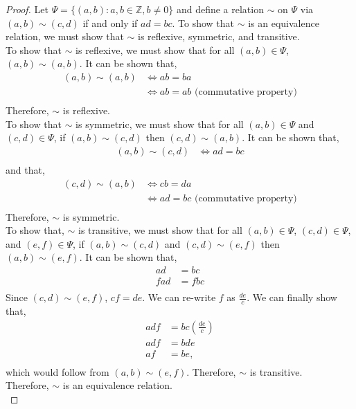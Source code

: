 \documentclass[12pt]{article}
\begin{document}
	\begin{proof}
	Let $\Psi = \{(a,b): a,b \in \mathbb{Z}, b\neq 0\}$ and define a relation $\sim$ on $\Psi$ via $(a,b) \sim (c,d)$ if and only if
	$ad=bc$. To show that $\sim$ is an equivalence relation, we must show that $\sim$ is reflexive, symmetric, and transitive.\\

	To show that $\sim$ is reflexive, we must show that for all $(a,b) \in \Psi$, $(a,b) \sim (a,b)$.
	It can be shown that, 
	\begin{align*}
		(a,b) \sim (a,b) &\Leftrightarrow ab=ba\\
				 &\Leftrightarrow ab=ab \text{ (commutative property)}\\
	\end{align*}
	Therefore, $\sim$ is reflexive.\\

	To show that $\sim$ is symmetric, we must show that for all $(a,b) \in \Psi$ and $(c,d) \in \Psi$, if $(a,b) \sim (c,d)$ then $(c,d) \sim (a,b)$.
	It can be shown that,
	\begin{align*}
		(a,b) \sim (c,d) &\Leftrightarrow ad=bc\\
	\end{align*}
	and that,
	\begin{align*}
		(c,d) \sim (a,b) &\Leftrightarrow cb=da\\
				 &\Leftrightarrow ad=bc \text{ (commutative property)}\\
	\end{align*}
	Therefore, $\sim$ is symmetric.\\

	To show that, $\sim$ is transitive, we must show that for all $(a,b) \in \Psi$, $(c,d) \in \Psi$, and $(e,f) \in \Psi$, if $(a,b) \sim (c,d)$ and $(c,d) \sim (e,f)$ then $(a,b) \sim (e,f)$.
	It can be shown that,
	\begin{align*}
		ad&=bc\\
		fad&=fbc\\
	\end{align*}
	Since $(c,d)\sim(e,f)$, $cf=de$. We can re-write $f$ as $\frac{de}{c}$. We can finally show that,
	\begin{align*}
		adf&=bc(\frac{de}{c})\\
		adf&=bde\\
		af&=be \text{,}\\
	\end{align*}
	which would follow from $(a,b)\sim(e,f)$. Therefore, $\sim$ is transitive.\\

	Therefore, $\sim$ is an equivalence relation.\\
\end{proof}
		
\end{document}
